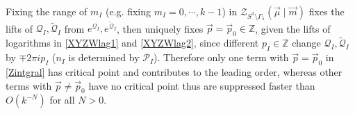 \documentclass[aps,prd,notitlepage,nofootinbib,superscriptaddress,groupedaddress,twocolumn]{revtex4-1}
\newcommand{\cz}{\mathcal Z}
\newcommand{\scrp}{\mathscr{P}}
\newcommand{\scrq}{\mathscr{Q}}
\newcommand{\G}{\Gamma}
\begin{document}
Fixing the range of $m_I$ (e.g. fixing $m_I=0,\cdots,k-1$) in $\mathcal{Z}_{S^{3}\setminus\Gamma_{5}}(\vec{\mu} \mid \vec{m})$ fixes the lifts of $\scrq_I,\widetilde{\scrq}_I$ from $e^{\scrq_I},e^{\widetilde{\scrq}_I}$, then uniquely fixes $\vec{p}=\vec{p}_0\in\mathbb{Z}$, given the lifts of logarithms in \eqref{XYZWlag1} and \eqref{XYZWlag2}, since different ${p}_I\in\mathbb{Z}$ change $\scrq_I,\widetilde{\scrq}_I$ by $\mp 2\pi i p_I$ ($n_I$ is determined by $\scrp_I$). Therefore only one term with $\vec{p}=\vec{p}_0$ in \eqref{Zintgral} has critical point and contributes to the leading order, whereas other terms with $\vec{p}\neq\vec{p}_0$ have no critical point thus are suppressed faster than $O(k^{-N})$ for all $N>0$.  



\end{document}
